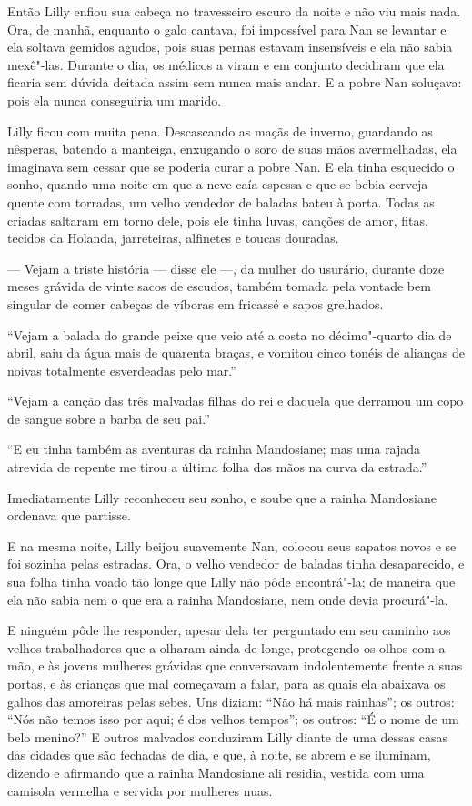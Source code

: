Então Lilly enfiou sua cabeça no travesseiro escuro da noite e não viu
mais nada. Ora, de manhã, enquanto o galo cantava, foi impossível para Nan
se levantar e ela soltava gemidos agudos, pois suas pernas estavam
insensíveis e ela não sabia mexê"-las. Durante o dia, os médicos a viram e
em conjunto decidiram que ela ficaria sem dúvida deitada assim sem nunca
mais andar. E a pobre Nan soluçava: pois ela nunca conseguiria um marido.

Lilly ficou com muita pena. Descascando as maçãs de inverno, guardando
as nêsperas, batendo a manteiga, enxugando o soro de suas mãos
avermelhadas, ela imaginava sem cessar que se poderia curar a pobre Nan. E
ela tinha esquecido o sonho, quando uma noite em que a neve caía espessa e
que se bebia cerveja quente com torradas, um velho vendedor de baladas
bateu à porta. Todas as criadas saltaram em torno dele, pois ele tinha
luvas, canções de amor, fitas, tecidos da Holanda, jarreteiras, alfinetes
e toucas douradas.

--- Vejam a triste história --- disse ele ---, da mulher do usurário, durante
doze meses grávida de vinte sacos de escudos, também tomada pela vontade
bem \mbox{singular} de comer cabeças de víboras em fricassé e sapos grelhados.

“Vejam a balada do grande peixe que veio até a costa no décimo"-quarto
dia de abril, saiu da água mais de quarenta braças, e vomitou cinco tonéis
de alianças de noivas totalmente esverdeadas pelo mar.”

“Vejam a canção das três malvadas filhas do rei e daquela que derramou
um copo de sangue sobre a barba de seu pai.”

“E eu tinha também as aventuras da rainha Mandosiane; mas uma rajada atrevida
de repente me tirou a última folha das mãos na curva da estrada.”

Imediatamente Lilly reconheceu seu sonho, e soube que a rainha
Mandosiane ordenava que partisse.

E na mesma noite, Lilly beijou suavemente Nan, colocou seus sapatos
novos e se foi sozinha pelas estradas. Ora, o velho vendedor de baladas
tinha desaparecido, e sua folha tinha voado tão longe que Lilly não pôde
encontrá"-la; de maneira que ela não sabia nem o que era a rainha
Mandosiane, nem onde devia procurá"-la.

E ninguém pôde lhe responder, apesar dela ter perguntado em seu caminho
aos velhos trabalhadores que a olharam ainda de longe, protegendo os olhos
com a mão, e às jovens mulheres grávidas que conversavam indolentemente
frente a suas portas, e às crianças que mal começavam a falar, para as
quais ela abaixava os galhos das amoreiras pelas sebes. Uns diziam: “Não
há mais rainhas”; os outros: “Nós não temos isso por aqui; é dos velhos
tempos”; os outros: “É o nome de um belo menino?” E outros malvados
conduziram Lilly diante de uma dessas casas das cidades que são fechadas
de dia, e que, à noite, se abrem e se iluminam, dizendo e afirmando que a
rainha Mandosiane ali residia, vestida com uma camisola vermelha e servida
por mulheres nuas.

